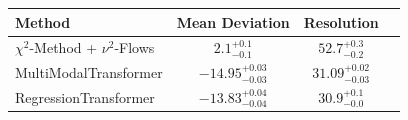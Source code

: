     \begin{tabular}{lccc}
        \toprule
        Method & Mean Deviation & Resolution \\
        \midrule
        $\chi^2$-Method + $\nu^2$-Flows & $2.1_{-0.1}^{+0.1}$ & $52.7_{-0.2}^{+0.3}$ \\
        MultiModalTransformer & $-14.95_{-0.03}^{+0.03}$ & $31.09_{-0.03}^{+0.02}$ \\
        RegressionTransformer & $-13.83_{-0.04}^{+0.04}$ & $30.9_{-0.0}^{+0.1}$ \\
        \bottomrule
    \end{tabular}